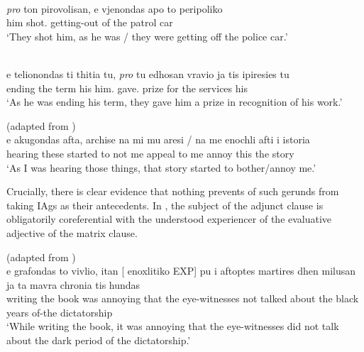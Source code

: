 \documentclass[output=paper]{langsci/langscibook}
\begin{document}
\ea%
    \label{ex:key:22.12} \\
    \gll    \emph{pro} ton   pirovolisan, e vjenondas   apo to      peripoliko\\
            {}       him  shot.\Tpl{} {}  getting-out  of    the    patrol car\\
    \glt    \enquote*{They shot him, as he was / they were getting off the police car.}
\z

\ea%
    \label{ex:key:22.13} \\
    \gll    e telionondas   ti   thitia   tu, \emph{pro} tu     edhosan  vravio ja   tis   ipiresies tu\\
            {} ending    the   term  his {} him.\Dat{}  gave.\Tpl{} prize    for  the services  his\\
    \glt    \enquote*{As he was ending his term, they gave him a prize in recognition of his work.}
\z\newpage

\ea%
    \label{ex:key:22.14}  (adapted from \citealt{Anagnostopoulou1999})\\
    \gll    e  akugondas   afta, archise  na   mi  mu  aresi / na   me  enochli        afti     i       istoria\\
    {}   hearing    these started    to  not  me  appeal {} to   me  annoy this     the  story\\
    \glt    \enquote*{As I was hearing those things, that story started to bother/annoy me.}
\z

Crucially, there is clear evidence that nothing prevents  of such
gerunds from taking \glspl{IAg} as their antecedents. In , the subject
of the adjunct clause is obligatorily coreferential with the understood
experiencer of the evaluative adjective of the matrix clause.

\ea%
    \label{ex:key:22.15}  (adapted from \citealt{Kotzoglou2016})\\
    \gll    e grafondas to   vivlio, itan [ enoxlitiko  EXP] pu      i   {aftoptes martires} dhen milusan  ja   ta  mavra   chronia tis     hundas\\
            {} writing    the   book   was {} annoying {} that the eye-witnesses not     talked     about  the   black   years of-the   dictatorship\\
    \glt    \enquote*{While writing the book, it was annoying that the eye-witnesses did not talk about the dark period of the dictatorship.}
\z
\end{document}
